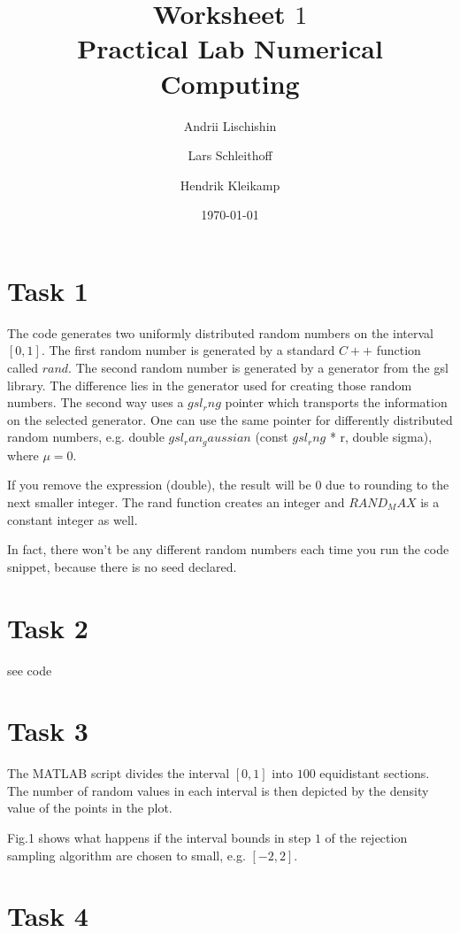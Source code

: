 \documentclass[10pt,a4paper]{article}
\begin{document}
\title{Worksheet $1$\\
\small{Practical Lab Numerical Computing}}
\author{Andrii Lischishin \and Lars Schleithoff \and Hendrik Kleikamp}
\date{\today}
\maketitle

\section*{Task 1}

The code generates two uniformly distributed random numbers on the interval $[0,1]$. The first random number is generated by a standard $C++$ function called $rand$.
The second random number is generated by a generator from the gsl library.
The difference lies in the generator used for creating those random numbers. The second way uses a $gsl_rng$ pointer which transports the information on the selected generator. 
One can use the same pointer for differently distributed random numbers, e.g. double $gsl_ran_gaussian$ (const $gsl_rng$ * r, double sigma), where $\mu=0$. 

If you remove the expression (double), the result will be $0$ due to rounding to the next smaller integer. The rand function creates an integer and $RAND_MAX$ is a constant integer as well. 

In fact, there won't be any different random numbers each time you run the code snippet, because there is no seed declared. 

\section*{Task 2}

see code

\section*{Task 3}

The MATLAB script divides the interval $[0,1]$ into $100$ equidistant sections. The number of random values in each interval is then depicted by the density value of the points in the plot.

Fig.1 shows what happens if the interval bounds in step $1$ of the rejection sampling algorithm are chosen to small, e.g. $[-2,2]$.  


\section*{Task 4}
\end{document}

